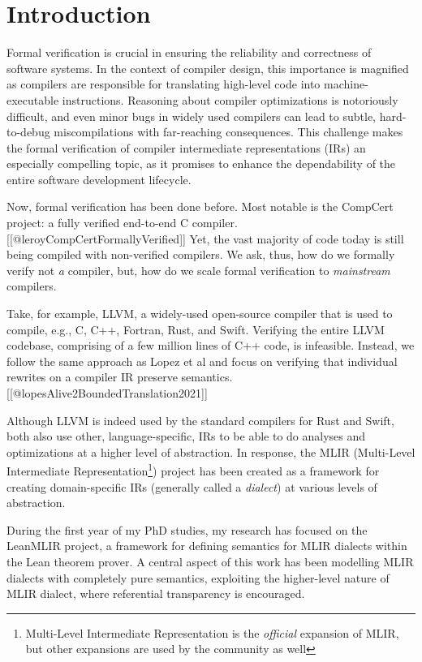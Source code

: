 
\section{Introduction}

Formal verification is crucial in ensuring the reliability and
correctness of software systems. In the context of compiler design, this
importance is magnified as compilers are responsible for translating
high-level code into machine-executable instructions. Reasoning about
compiler optimizations is notoriously difficult, and even minor bugs in
widely used compilers can lead to subtle, hard-to-debug miscompilations
with far-reaching consequences. This challenge makes the formal
verification of compiler intermediate representations (IRs) an
especially compelling topic, as it promises to enhance the dependability
of the entire software development lifecycle.

Now, formal verification has been done before. Most notable is the
CompCert project: a fully verified end-to-end C compiler.
{[}{[}@leroyCompCertFormallyVerified{]}{]} Yet, the vast majority of
code today is still being compiled with non-verified compilers. We ask,
thus, how do we formally verify not \emph{a} compiler, but, how do we
scale formal verification to \emph{mainstream} compilers.

Take, for example, LLVM, a widely-used open-source compiler that is used
to compile, e.g., C, C++, Fortran, Rust, and Swift. Verifying the entire
LLVM codebase, comprising of a few million lines of C++ code, is
infeasible. Instead, we follow the same approach as Lopez et al and
focus on verifying that individual rewrites on a compiler IR preserve
semantics. {[}{[}@lopesAlive2BoundedTranslation2021{]}{]}

Although LLVM is indeed used by the standard compilers for Rust and
Swift, both also use other, language-specific, IRs to be able to do
analyses and optimizations at a higher level of abstraction. In
response, the MLIR (Multi-Level Intermediate Representation\footnote{Multi-Level
  Intermediate Representation is the \emph{official} expansion of MLIR,
  but other expansions are used by the community as well}) project has
been created as a framework for creating domain-specific IRs (generally
called a \emph{dialect}) at various levels of abstraction.

During the first year of my PhD studies, my research has focused on the
LeanMLIR project, a framework for defining semantics for MLIR dialects
within the Lean theorem prover. A central aspect of this work has been
modelling MLIR dialects with completely pure semantics, exploiting the
higher-level nature of MLIR dialect, where referential transparency is
encouraged.

